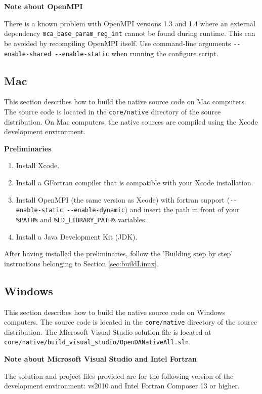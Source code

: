 \textbf{Note about OpenMPI}

There is a known problem with OpenMPI versions 1.3 and 1.4 where an external dependency \verb|mca_base_param_reg_int| cannot be found during runtime. This can be avoided by recompiling OpenMPI itself. Use command-line arguments \verb|--enable-shared --enable-static| when running the configure script. 

\subsection{Mac}

This section describes how to build the \oda native source code on Mac computers. The source code is located in the \verb|core/native| directory of the source distribution. On Mac computers, the native sources are compiled using the Xcode development environment. 

\textbf{Preliminaries}

\begin{enumerate}
	\item Install Xcode.
	\item Install a GFortran compiler that is compatible with your Xcode installation.
	\item Install OpenMPI (the same version as Xcode) with fortran support (\verb|--enable-static --enable-dynamic|) and insert the path in front of your \verb|%PATH%| and \verb|%LD_LIBRARY_PATH%| variables.
	\item Install a Java Development Kit (JDK).
\end{enumerate}

After having installed the preliminaries, follow the 'Building step by step' instructions belonging to Section \ref{sec:buildLinux}.

\subsection{Windows}
\label{dc:build:windows}

This section describes how to build the \oda native source code on Windows computers. The source code is located in the \verb|core/native| directory of the source distribution. The Microsoft Visual Studio solution file is located at \verb|core/native/build_visual_studio/OpenDANativeAll.sln|.

\textbf{Note about Microsoft Visual Studio and Intel Fortran}

The solution and project files provided are for the following version of the development environment: vs2010 and Intel Fortran Composer 13 or higher.

